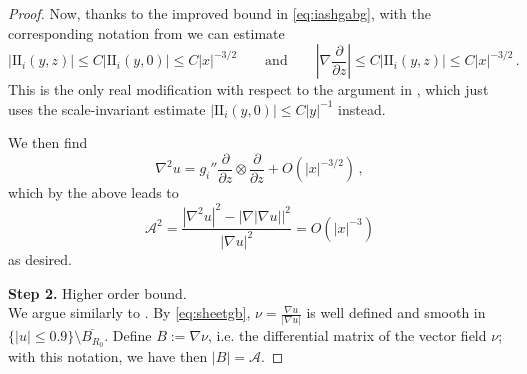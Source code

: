 \documentclass{article}
\theoremstyle{definition}
\begin{document}
\begin{proof}
    
    Now, thanks to the improved bound in \eqref{eq:iashgabg}, with the corresponding notation from \cite{WW17arXiv} we can estimate
    $$
    |\mathrm{II}_i(y,z)|\leq C|\mathrm{II}_i(y,0)|\leq C|x|^{-3/2} \qquad\mbox{and}\qquad \left|\nabla\frac{\partial}{\partial z}\right|\leq C |\mathrm{II}_i(y,z)|\leq C|x|^{-3/2}\,.
    $$
    This is the only real modification with respect to the argument in \cite{WW17arXiv}, which just uses the scale-invariant estimate $|\mathrm{II}_i(y,0)|\leq C|y|^{-1}$ instead.
    
    We then find
    \begin{equation*}
        \nabla^2 u = g_i'' \frac{\partial}{\partial z}\otimes\frac{\partial}{\partial z} +O(|x|^{-3/2})\,,
    \end{equation*}
    which by the above leads to
    \begin{equation*}
        \mathcal A^2=\frac{|\nabla^2 u|^2-|\nabla|\nabla u||^2}{|\nabla u|^2}=O(|x|^{-3})
    \end{equation*}
    as desired.
    
    {\bf Step 2.} Higher order bound.\\
    We argue similarly to \cite[Lemma 8.1]{WW18}. By \eqref{eq:sheetgb}, \( \nu = \frac{\nabla u}{|\nabla u|} \) is well defined and smooth in \( \{ |u| \leq 0.9 \} \setminus \overline{B_{R_0}}\). Define \( B := \nabla \nu \), i.e. the differential matrix of the vector field $\nu$; with this notation, we have then $|B|=\mathcal A$.


\end{proof}
\end{document}
